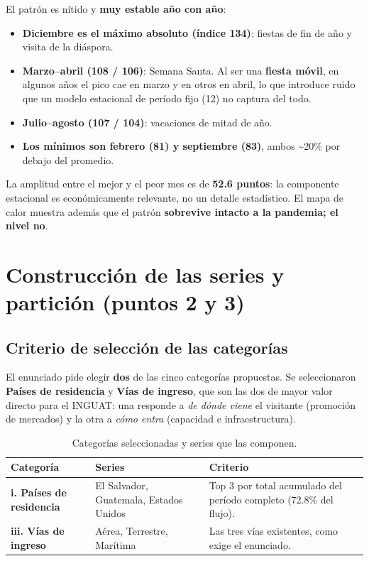 \documentclass[12pt,letterpaper]{article}
\newcommand{\seccion}[1]{\section{#1}}
\newcommand{\subseccion}[1]{\subsection{#1}}
\begin{document}
El patrón es nítido y \textbf{muy estable año con año}:

\begin{itemize}[leftmargin=1.4em,itemsep=2pt]
  \item \textbf{Diciembre es el máximo absoluto (índice 134)}: fiestas de fin de año y visita
  de la diáspora.
  \item \textbf{Marzo--abril (108 / 106)}: Semana Santa. Al ser una \textbf{fiesta móvil}, en
  algunos años el pico cae en marzo y en otros en abril, lo que introduce ruido que un modelo
  estacional de período fijo (12) no captura del todo.
  \item \textbf{Julio--agosto (107 / 104)}: vacaciones de mitad de año.
  \item \textbf{Los mínimos son febrero (81) y septiembre (83)}, ambos \textasciitilde20\% por
  debajo del promedio.
\end{itemize}

La amplitud entre el mejor y el peor mes es de \textbf{52.6 puntos}: la componente estacional es
económicamente relevante, no un detalle estadístico. El mapa de calor muestra además que el
patrón \textbf{sobrevive intacto a la pandemia; el nivel no}.

\seccion{Construcción de las series y partición (puntos 2 y 3)}

\subseccion{Criterio de selección de las categorías}

El enunciado pide elegir \textbf{dos} de las cinco categorías propuestas. Se seleccionaron
\textbf{Países de residencia} y \textbf{Vías de ingreso}, que son las dos de mayor valor
directo para el INGUAT: una responde a \textit{de dónde viene} el visitante (promoción de
mercados) y la otra a \textit{cómo entra} (capacidad e infraestructura).

\begin{table}[H]
\centering
\small
\begin{tabularx}{\textwidth}{llX}
\toprule
\textbf{Categoría} & \textbf{Series} & \textbf{Criterio} \\
\midrule
\textbf{i. Países de residencia} & El Salvador, Guatemala, Estados Unidos & Top 3 por total
acumulado del período completo (72.8\% del flujo). \\
\textbf{iii. Vías de ingreso} & Aérea, Terrestre, Marítima & Las tres vías existentes, como
exige el enunciado. \\
\bottomrule
\end{tabularx}
\caption{Categorías seleccionadas y series que las componen.}
\end{table}
\end{document}
